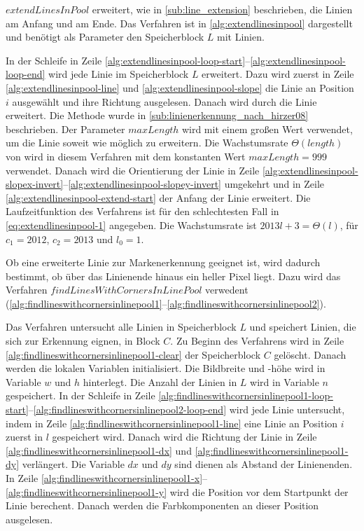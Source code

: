 $\mathit{extendLinesInPool}$ erweitert, wie in \autoref{sub:line_extension} beschrieben, die Linien am Anfang und am
 Ende. Das Verfahren ist in \autoref{alg:extendlinesinpool} dargestellt und benötigt als Parameter den Speicherblock
 $L$ mit Linien.

In der Schleife in Zeile \ref{alg:extendlinesinpool-loop-start}--\ref{alg:extendlinesinpool-loop-end} wird jede Linie im
 Speicherblock $L$ erweitert. Dazu wird zuerst in Zeile \ref{alg:extendlinesinpool-line} und
 \ref{alg:extendlinesinpool-slope} die Linie an Position $i$ ausgewählt und ihre Richtung ausgelesen. Danach wird durch
  die Linie erweitert. Die Methode  wurde in
 \autoref{sub:linienerkennung_nach_hirzer08} beschrieben. Der Parameter $\mathit{maxLength}$ wird mit einem großen Wert
 verwendet, um die Linie soweit wie möglich zu erweitern. Die Wachstumsrate $\Theta(\mathit{length})$ von
  wird in diesem Verfahren mit dem konstanten Wert $\mathit{maxLength} = 999$ verwendet. Danach
 wird die Orientierung der Linie in Zeile
 \ref{alg:extendlinesinpool-slopex-invert}--\ref{alg:extendlinesinpool-slopey-invert} umgekehrt und in Zeile
 \ref{alg:extendlinesinpool-extend-start} der Anfang der Linie erweitert. Die Laufzeitfunktion des Verfahrens ist für
 den schlechtesten Fall in \autoref{eq:extendlinesinpool-1} angegeben. Die Wachstumsrate ist $2013l + 3 = \Theta(l)$,
 für $c_{1} = 2012$, $c_{2} = 2013$ und $l_{0} = 1$.


Ob eine erweiterte Linie zur Markenerkennung geeignet ist, wird dadurch bestimmt, ob über das Linienende hinaus ein
 heller Pixel liegt. Dazu wird das Verfahren $\mathit{findLinesWithCornersInLinePool}$ verwedent
 (\autoref{alg:findlineswithcornersinlinepool1}--\autoref{alg:findlineswithcornersinlinepool2}).




Das Verfahren untersucht alle Linien in Speicherblock $L$ und speichert Linien, die sich zur Erkennung eignen, in Block
 $C$. Zu Beginn des Verfahrens wird in Zeile \ref{alg:findlineswithcornersinlinepool1-clear} der Speicherblock $C$
 gelöscht. Danach werden die lokalen Variablen initialisiert. Die Bildbreite und -höhe wird in Variable $w$ und $h$
 hinterlegt. Die Anzahl der Linien in $L$ wird in Variable $n$ gespeichert. In der Schleife in Zeile
 \ref{alg:findlineswithcornersinlinepool1-loop-start}--\ref{alg:findlineswithcornersinlinepool2-loop-end} wird jede
 Linie untersucht, indem in Zeile \ref{alg:findlineswithcornersinlinepool1-line} eine Linie an Position $i$ zuerst in
 $l$ gespeichert wird. Danach wird die Richtung der Linie in Zeile \ref{alg:findlineswithcornersinlinepool1-dx} und
 \ref{alg:findlineswithcornersinlinepool1-dy} verlängert. Die Variable $dx$ und $dy$ sind dienen als Abstand der
 Linienenden. In Zeile \ref{alg:findlineswithcornersinlinepool1-x}--\ref{alg:findlineswithcornersinlinepool1-y} wird
 die Position vor dem Startpunkt der Linie berechent. Danach werden die Farbkomponenten an dieser Position ausgelesen.

